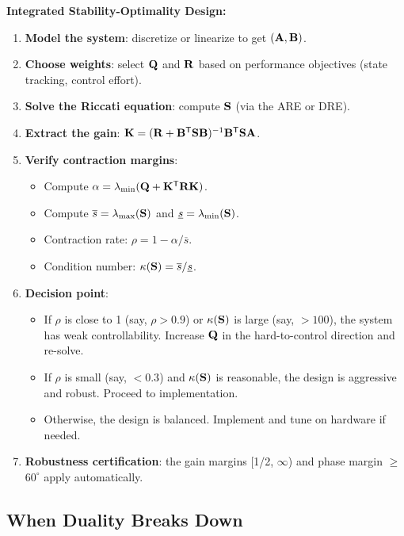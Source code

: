 \begin{designbox}
\textbf{Integrated Stability-Optimality Design:}
\begin{enumerate}
\item \textbf{Model the system}: discretize or linearize to get $(\mathbf{A}, \mathbf{B})$.
\item \textbf{Choose weights}: select $\mathbf{Q}$ and $\mathbf{R}$ based on performance objectives (state tracking, control
      effort).
\item \textbf{Solve the Riccati equation}: compute $\mathbf{S}$ (via the ARE or DRE).
\item \textbf{Extract the gain}: $\mathbf{K} = (\mathbf{R} + \mathbf{B}^{\mathsf{T}}\mathbf{S}\mathbf{B})^{-1}\mathbf{B}^{\mathsf{T}}\mathbf{S}\mathbf{A}$.
\item \textbf{Verify contraction margins}:
      \begin{itemize}
      \item Compute $\alpha = \lambda_{\min}(\mathbf{Q} + \mathbf{K}^{\mathsf{T}}\mathbf{R}\mathbf{K})$.
      \item Compute $\overline{s} = \lambda_{\max}(\mathbf{S})$ and $\underline{s} = \lambda_{\min}(\mathbf{S})$.
      \item Contraction rate: $\rho = 1 - \alpha/\overline{s}$.
      \item Condition number: $\kappa(\mathbf{S}) = \overline{s}/\underline{s}$.
      \end{itemize}
\item \textbf{Decision point}:
      \begin{itemize}
      \item If $\rho$ is close to 1 (say, $\rho > 0.9$) or $\kappa(\mathbf{S})$ is large (say, $> 100$), the system
            has weak controllability. Increase $\mathbf{Q}$ in the hard-to-control direction and re-solve.
      \item If $\rho$ is small (say, $< 0.3$) and $\kappa(\mathbf{S})$ is reasonable, the design is aggressive and
            robust. Proceed to implementation.
      \item Otherwise, the design is balanced. Implement and tune on hardware if needed.
      \end{itemize}
\item \textbf{Robustness certification}: the gain margins [1/2, $\infty$) and phase margin $\geq$ $60^\circ$ apply automatically.
\end{enumerate}
\end{designbox}

\subsection{When Duality Breaks Down}

